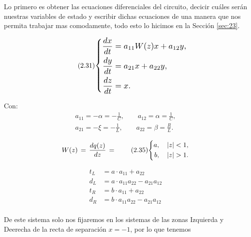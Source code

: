 \documentclass[12pt,a4paper]{report} %
\begin{document}
	\vspace{0.5cm} Lo primero es obtener las ecuaciones diferenciales del circuito, decicir cuáles serán nuestras variables de estado y escribir dichas ecuaciones de una manera que nos permita trabajar mas comodamente, todo esto lo hicimos en la Sección \ref{sec:23}.
	
	\begin{equation}
		\tag{2.31}
		\scalebox{1.2}{$\displaystyle
			\left\{
			\begin{aligned}
				\frac{dx}{dt} &= a_{11}W(z)x+a_{12}y, \\
				\frac{dy}{dt} &=  a_{21}x+ a_{22}y, \\
				\frac{dz}{dt} &= x.
			\end{aligned}
			\right.
			$}
	\end{equation}\smallskip
	
		Con:
	\begin{equation}
		\tag{2.32}
		\begin{gathered}
			a_{11}=-\alpha=-\frac{1}{C}, \qquad a_{12}=\alpha=\frac{1}{C},\\[2mm]
			a_{21}=-\xi =-\frac{1}{L}, \qquad a_{22}=\beta = \frac{R}{L}.
		\end{gathered}
	\end{equation}\smallskip
	
	\begin{equation}
		W(z)\,=\,\frac{dq(z)}{dz}\,=\,
		\tag{2.35}
		\scalebox{1}{$\displaystyle
			\left\{
			\begin{aligned}
				a, \quad   |z| < 1,\\
				b, \quad   |z| > 1.
			\end{aligned}
			\right.
			$}
	\end{equation}\smallskip
	
	\begin{equation}
		\tag{2.37}
		\begin{aligned}
			t_L &= a \cdot a_{11} + a_{22}\\
			d_L &= a \cdot a_{11}a_{22} - a_{21}a_{12}\\
			t_R &= b \cdot a_{11} + a_{22}\\
			d_R &= b \cdot a_{11}a_{22} - a_{21}a_{12}\\
		\end{aligned}
	\end{equation}\smallskip
	
	De este sistema solo nos fijaremos en los sistemas de las zonas Izquierda y Deerecha de la recta de separación $x=-1$, por lo que tenemos
	
\end{document}
